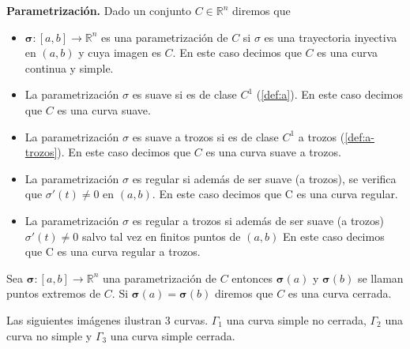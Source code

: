     
    
\begin{definition}{\textbf{Parametrizaci\'on.}}\label{param}  Dado un conjunto $C \in \mathbb{R}^{n}$ diremos  que

\begin{itemize}

\item[a.]  $\boldsymbol{\sigma}: [a,b] \rightarrow\mathbb{R}^n$  es una parametrizaci\'on de $C$ si 
 $\sigma$ es una trayectoria  inyectiva en $(a,b)$  y cuya imagen es $C$. En este caso decimos que
$C$ es una curva continua y simple.

\item[b.] La parametrizaci\'on  $\sigma$ es suave si  es de clase $C^{1}$   (\ref{def:a}). En este caso decimos que
$C$ es una curva  suave. 

\item[c.] La parametrizaci\'on  $\sigma$ es suave a trozos si  es de clase $C^{1}$ a trozos (\ref{def:a-trozos}). En este caso decimos que
$C$ es una curva  suave a trozos. 

 \item[d.] La parametrización  $\sigma$  es regular si además de ser suave (a trozos), se verifica que
 $\sigma'(t)\neq 0$  en  $(a,b)$.  En este caso decimos que C es una curva regular.
 
\item[e.]  La parametrización  $\sigma$  es regular a trozos  si además de ser suave (a trozos)  $\sigma'(t)\neq 0$  salvo tal vez en finitos puntos de $(a,b)$  En este caso decimos que C es una curva regular a trozos.
\end{itemize}
\end{definition} 


\begin{definition} Sea $\boldsymbol{\sigma}: [a,b] \rightarrow\mathbb{R}^n$   una parametrizaci\'on de $C$ entonces $\boldsymbol{\sigma}(a)$ y $\boldsymbol{\sigma}(b)$  se llaman puntos extremos de $C$. Si $\boldsymbol{\sigma}(a)= \boldsymbol{\sigma}(b)$ diremos que $C$ es una curva cerrada. 
\end{definition} 

\begin{example} Las siguientes im\'agenes ilustran 3 curvas.  $\Gamma_1$ una curva simple no cerrada,  $\Gamma_2$ una curva no simple  y  $\Gamma_3$ una curva simple cerrada.   
\end{example}


